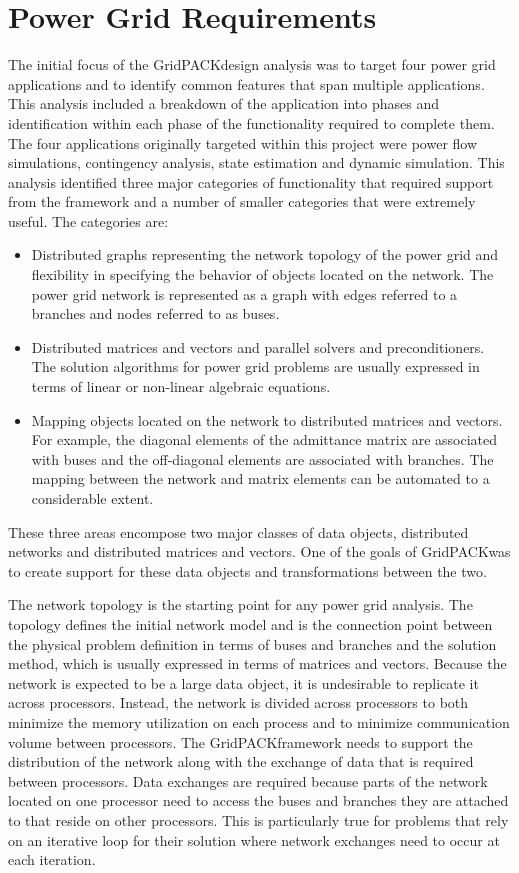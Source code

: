 \documentclass{acm_proc_article-sp}
\begin{document}
\section{Power Grid Requirements}
The initial focus of the GridPACK\texttrademark design analysis was to target
four power grid
applications and to identify common features that span multiple applications.
This analysis included a breakdown of the
application into phases and identification within each phase of the functionality
required to complete them. The four applications originally targeted within this
project were power flow simulations\cite{PF}, contingency analysis\cite{CA},
state estimation\cite{SE} and
dynamic simulation\cite{DS}. This analysis identified three major categories of
functionality that
required support from the framework and a number of smaller categories that were
extremely useful. The categories are:
\begin{itemize}
\item Distributed graphs representing the network topology of the power grid
and flexibility in specifying the behavior of objects located on the network.
The power grid network is represented as a graph with edges referred to a
branches and nodes referred to as buses. 
\item Distributed matrices and vectors and parallel solvers and
preconditioners. The solution algorithms for power grid problems are usually
expressed in terms of linear or non-linear algebraic equations. 
\item Mapping objects located on the network to distributed matrices and vectors.
For example, the diagonal elements of the admittance matrix are associated with
buses and the off-diagonal elements are associated with branches. The mapping
between the network and matrix elements can be automated to a considerable
extent.
\end{itemize}
These three areas encompose two major classes of data objects,
distributed networks and distributed matrices and vectors. One of the goals of
GridPACK\texttrademark was to create support for these data objects and transformations
between the two.

The network topology is the starting point for any power grid analysis. The
topology defines the initial network model and is the connection point between
the physical problem definition in terms of buses and branches and the solution
method, which is usually expressed in terms of matrices and vectors. Because the
network is expected to be a large data object, it is undesirable to replicate
it across processors. Instead, the network is divided across processors
to both minimize the memory utilization on each process and to minimize
communication volume between processors. The GridPACK\texttrademark framework needs to
support the distribution of the network along with the exchange of data that is
required between processors. Data exchanges are required because parts of the
network located on one processor need to access the buses and branches they are
attached to that reside on other processors. This is particularly true for
problems that rely on an iterative loop for their solution where network
exchanges need to occur at each iteration.
\end{document}
